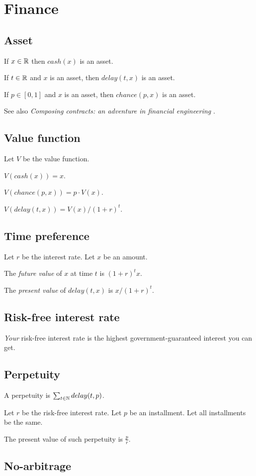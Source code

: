 \chapter{Finance}

\section{Asset}

If \(x \in \mathbb{R}\) then \(cash(x)\) is an asset.

If \(t \in \mathbb{R}\) and \(x\) is an asset,
then \(delay(t,x)\) is an asset.

If \(p \in [0,1]\) and \(x\) is an asset,
then \(chance(p,x)\) is an asset.

See also \emph{Composing contracts: an adventure in financial engineering} \cite{SpjContract}.

\section{Value function}

Let \(V\) be the value function.

\(V(cash(x)) = x\).

\(V(chance(p,x)) = p \cdot V(x)\).

\(V(delay(t,x)) = V(x)/(1+r)^t\).

\section{Time preference}

Let \(r\) be the interest rate.
Let \(x\) be an amount.

The \emph{future value} of \(x\) at time \(t\) is \((1+r)^t x\).

The \emph{present value} of \(delay(t,x)\) is \(x / (1+r)^t\).

\section{Risk-free interest rate}

\emph{Your} risk-free interest rate is
the highest government-guaranteed interest you can get.

\section{Perpetuity}

A perpetuity is \(\sum_{t \in \mathbb{N}} delay(t,p) \).

Let \(r\) be the risk-free interest rate.
Let \(p\) be an installment.
Let all installments be the same.

The present value of such perpetuity is \(\frac{p}{r}\).

\section{No-arbitrage}
